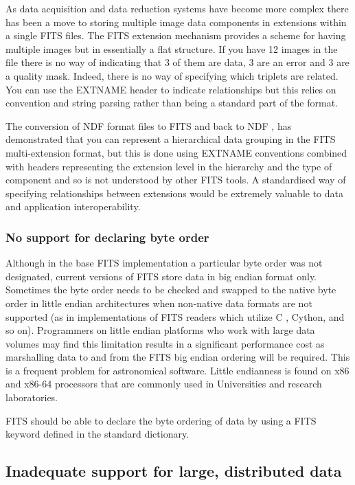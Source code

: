 \documentclass[final,authoryear,5p,times,twocolumn]{elsarticle}
\begin{document}
As data acquisition and data reduction systems have become more
complex there has been a move to storing multiple image data
components in extensions within a single FITS files. The FITS
extension mechanism provides a scheme for having multiple images but
in essentially a flat structure. If you have 12 images in the file
there is no way of indicating that 3 of them are data, 3 are an error
and 3 are a quality mask. Indeed, there is no way of specifying which
triplets are related. You can use the EXTNAME header to indicate
relationships but this relies on convention and string parsing rather
than being a standard part of the format.


The conversion of NDF format files to FITS and back to NDF
\citep{SUN55,1997STARB..19...14C}, has demonstrated that you can
represent a hierarchical data grouping in the FITS multi-extension
format, but this is done using EXTNAME conventions combined with
headers representing the extension level in the hierarchy and the type
of component and so is not understood by other FITS tools. A
standardised way of specifying relationships between extensions would
be extremely valuable to data and application interoperability.


\subsubsection{No support for declaring byte order}


Although in the base FITS implementation \citep{1981A&AS...44..363W} a
particular byte order was not designated, current versions of FITS
store data in big endian format only. Sometimes the byte order needs
to be checked and swapped to the native byte order in little endian
architectures when non-native data formats are not supported (as in
implementations of FITS readers which utilize C , Cython, and so
on). Programmers on little endian platforms who work with large data
volumes may find this limitation results in a significant performance
cost as marshalling data to and from the FITS big endian ordering will
be required. This is a frequent problem for astronomical
software. Little endianness is found on x86 and x86-64 processors that
are commonly used in Universities and research laboratories.


FITS should be able to declare the byte ordering of data by using a
FITS keyword defined in the standard dictionary.


\subsection{Inadequate support for large, distributed data}
\end{document}
